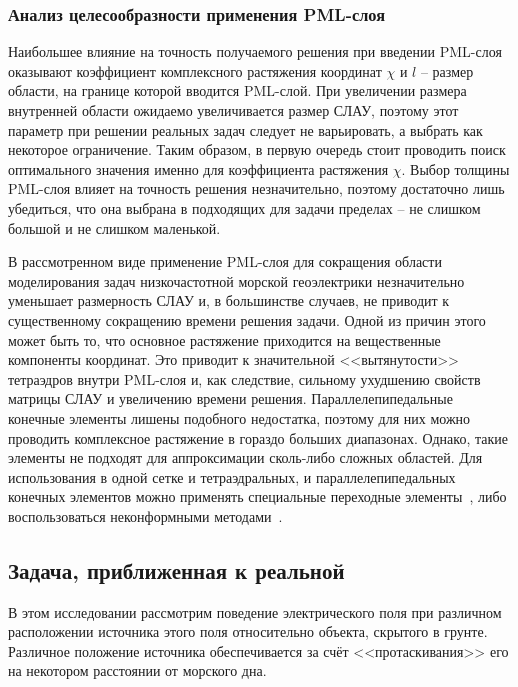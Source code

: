 \documentclass[a4paper,14pt]{article}
\begin{document}

\subsubsection{Анализ целесообразности применения PML-слоя}
Наибольшее влияние на точность получаемого решения при введении PML-слоя оказывают коэффициент комплексного растяжения координат $\chi$ и $l$ -- размер области, на границе которой вводится PML-слой. При увеличении размера внутренней области ожидаемо увеличивается размер СЛАУ, поэтому этот параметр при решении реальных задач следует не варьировать, а выбрать как некоторое ограничение. Таким образом, в первую очередь стоит проводить поиск оптимального значения именно для коэффициента растяжения $\chi$. Выбор толщины PML-слоя влияет на точность решения незначительно, поэтому достаточно лишь убедиться, что она выбрана в подходящих для задачи пределах -- не слишком большой и не слишком маленькой.

В рассмотренном виде применение PML-слоя для сокращения области моделирования задач низкочастотной морской геоэлектрики незначительно уменьшает размерность СЛАУ и, в большинстве случаев, не приводит к существенному сокращению времени решения задачи. Одной из причин этого может быть то, что основное растяжение приходится на вещественные компоненты координат. Это приводит к значительной <<вытянутости>> тетраэдров внутри PML-слоя и, как следствие, сильному ухудшению свойств матрицы СЛАУ и увеличению времени решения. Параллелепипедальные конечные элементы лишены подобного недостатка, поэтому для них можно проводить комплексное растяжение в гораздо больших диапазонах. Однако, такие элементы не подходят для аппроксимации сколь-либо сложных областей. Для использования в одной сетке и тетраэдральных, и параллелепипедальных конечных элементов можно применять специальные переходные элементы~\citep{extra_elements1,extra_elements2}, либо воспользоваться неконформными методами~\citep{dg1,dg2,dg3,mortar1,mortar2}.


\subsection{Задача, приближенная к реальной}
В этом исследовании рассмотрим поведение электрического поля при различном расположении источника этого поля относительно объекта, скрытого в грунте. Различное положение источника обеспечивается за счёт <<протаскивания>> его на некотором расстоянии от морского дна.
\end{document}
